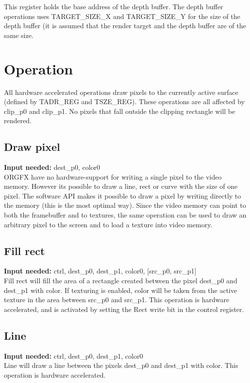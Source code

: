 \documentclass[10pt,a4paper]{article}
\begin{document}
This register holds the base address of the depth buffer. The depth buffer operations uses TARGET\_SIZE\_X and TARGET\_SIZE\_Y for the size of the depth buffer (it is assumed that the render target and the depth buffer are of the same size.

\section{Operation}
All hardware accelerated operations draw pixels to the currently active surface (defined by TADR\_REG and TSZE\_REG). These operations are all affected by clip\_p0 and clip\_p1. No pixels that fall outside the clipping rectangle will be rendered.

\subsection{Draw pixel}
\textbf{Input needed:} dest\_p0, color0\\
ORGFX have no hardware-support for writing a single pixel to the video memory. However its possible to draw a line, rect or curve with the size of one pixel. The software API makes it possible to draw a pixel by writing directly to the memory (this is the most optimal way). Since the video memory can point to both the framebuffer and to textures, the same operation can be used to draw an arbitrary pixel to the screen and to load a texture into video memory.

\subsection{Fill rect}
\textbf{Input needed:} ctrl, dest\_p0, dest\_p1, color0, [src\_p0, src\_p1]\\
Fill rect will fill the area of a rectangle created between the pixel dest\_p0 and  dest\_p1 with color. If texturing is enabled, color will be taken from the active texture in the area between src\_p0 and src\_p1. This operation is hardware accelerated, and is activated by setting the Rect write bit in the control register.

\subsection{Line}
\textbf{Input needed:} ctrl, dest\_p0, dest\_p1, color0\\
Line will draw a line between the pixels dest\_p0 and dest\_p1 with color. This operation is hardware accelerated.
\end{document}
